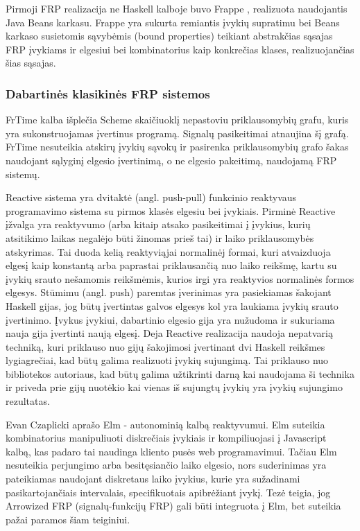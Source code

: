 Pirmoji FRP realizacija ne Haskell kalboje buvo Frappe \cite{Courtney:2001:FFR:645771.667929}, realizuota naudojantis Java Beans karkasu. Frappe yra sukurta remiantis įvykių supratimu bei Beans karkaso susietomis sąvybėmis (bound properties) teikiant abstrakčias sąsajas FRP įvykiams ir elgesiui bei kombinatorius kaip konkrečias klases, realizuojančias šias sąsajas. 

\subsubsection{Dabartinės klasikinės FRP sistemos}

FrTime \cite{Ignatoff:2006:CSL:2100071.2100097} kalba išplečia Scheme skaičiuoklį nepastoviu priklausomybių grafu, kuris yra sukonstruojamas įvertinus programą. Signalų pasikeitimai atnaujina šį grafą. FrTime nesuteikia atskirų įvykių sąvokų ir pasirenka priklausomybių grafo šakas naudojant sąlyginį elgesio įvertinimą, o ne elgesio pakeitimą, naudojamą FRP sistemų.

Reactive \cite{Elliott:2009:PFR:1596638.1596643} sistema yra dvitaktė (angl. push-pull) funkcinio reaktyvaus programavimo sistema su pirmos klasės elgesiu bei įvykiais. Pirminė Reactive įžvalga yra reaktyvumo (arba kitaip atsako pasikeitimai į įvykius, kurių atsitikimo laikas negalėjo būti žinomas prieš tai) ir laiko priklausomybės atskyrimas. Tai duoda kelią reaktyviąjai normalinėj formai, kuri atvaizduoja elgesį kaip konstantą arba paprastai priklausančią nuo laiko reikšmę, kartu su įvykių srauto nešamomis reikšmėmis, kurios irgi yra reaktyvios normalinės formos elgesys. Stūmimu (angl. push) paremtas įverinimas yra pasiekiamas šakojant Haskell gijas, jog būtų įvertintas galvos elgesys kol yra laukiama įvykių srauto įvertinimo. Įvykus įvykiui, dabartinio elgesio gija yra nužudoma ir sukuriama nauja gija įvertinti naują elgesį. Deja Reactive realizacija naudoja nepatvarią techniką, kuri priklauso nuo gijų šakojimosi įvertinant dvi Haskell reikšmes lygiagrečiai, kad būtų galima realizuoti įvykių sujungimą. Tai priklauso nuo bibliotekos autoriaus, kad būtų galima užtikrinti darną kai naudojama ši technika ir priveda prie gijų nuotėkio kai vienas iš sujungtų įvykių yra įvykių sujungimo rezultatas.

Evan Czaplicki \cite{Czaplicki:2013:AFR:2499370.2462161} aprašo Elm - autonominią kalbą reaktyvumui. Elm suteikia kombinatorius manipuliuoti diskrečiais įvykiais ir kompiliuojasi į Javascript kalbą, kas padaro tai naudinga kliento pusės web programavimui. Tačiau Elm nesuteikia perjungimo arba besitęsiančio laiko elgesio, nors suderinimas yra pateikiamas naudojant diskretaus laiko įvykius, kurie yra sužadinami pasikartojančiais intervalais, specifikuotais apibrėžiant įvykį. Tezė teigia, jog Arrowized FRP (signalų-funkcijų FRP) gali būti integruota į Elm, bet suteikia pažai paramos šiam teiginiui.

